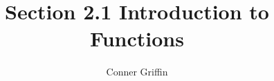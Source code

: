 \documentclass{ximera}
\title{Section 2.1 Introduction to Functions}
\author{Conner Griffin}
\begin{document}
\begin{abstract}
    
\end{abstract}
\maketitle










\end{document}

